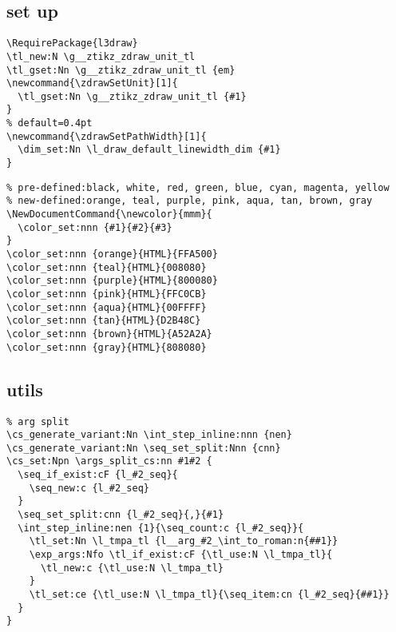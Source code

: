 \subsection{set up}
\begin{verbatim}
\RequirePackage{l3draw}
\tl_new:N \g__ztikz_zdraw_unit_tl
\tl_gset:Nn \g__ztikz_zdraw_unit_tl {em}
\newcommand{\zdrawSetUnit}[1]{
  \tl_gset:Nn \g__ztikz_zdraw_unit_tl {#1}
}
% default=0.4pt
\newcommand{\zdrawSetPathWidth}[1]{
  \dim_set:Nn \l_draw_default_linewidth_dim {#1}
}
\end{verbatim}

\begin{verbatim}
% pre-defined:black, white, red, green, blue, cyan, magenta, yellow
% new-defined:orange, teal, purple, pink, aqua, tan, brown, gray
\NewDocumentCommand{\newcolor}{mmm}{
  \color_set:nnn {#1}{#2}{#3}
}
\color_set:nnn {orange}{HTML}{FFA500}
\color_set:nnn {teal}{HTML}{008080}
\color_set:nnn {purple}{HTML}{800080}
\color_set:nnn {pink}{HTML}{FFC0CB}
\color_set:nnn {aqua}{HTML}{00FFFF}
\color_set:nnn {tan}{HTML}{D2B48C}
\color_set:nnn {brown}{HTML}{A52A2A}
\color_set:nnn {gray}{HTML}{808080}
\end{verbatim}


\subsection{utils}
\begin{verbatim}
% arg split 
\cs_generate_variant:Nn \int_step_inline:nnn {nen}
\cs_generate_variant:Nn \seq_set_split:Nnn {cnn}
\cs_set:Npn \args_split_cs:nn #1#2 {
  \seq_if_exist:cF {l_#2_seq}{
    \seq_new:c {l_#2_seq}
  }
  \seq_set_split:cnn {l_#2_seq}{,}{#1}
  \int_step_inline:nen {1}{\seq_count:c {l_#2_seq}}{
    \tl_set:Nn \l_tmpa_tl {l__arg_#2_\int_to_roman:n{##1}}
    \exp_args:Nfo \tl_if_exist:cF {\tl_use:N \l_tmpa_tl}{
      \tl_new:c {\tl_use:N \l_tmpa_tl}
    }
    \tl_set:ce {\tl_use:N \l_tmpa_tl}{\seq_item:cn {l_#2_seq}{##1}}
  }
}
\end{verbatim}


